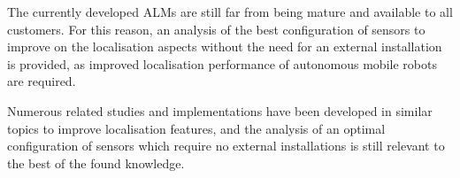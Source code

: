 The currently developed \glspl{ALM} are still far from being mature and available to all customers.
For this reason, an analysis of the best configuration of sensors to improve on the localisation aspects without the need for an external installation is provided, as improved localisation performance of autonomous mobile robots are required.

Numerous related studies and implementations have been developed in similar topics to improve localisation features, and the analysis of an optimal configuration of sensors which require no external installations is still relevant to the best of the found knowledge.





